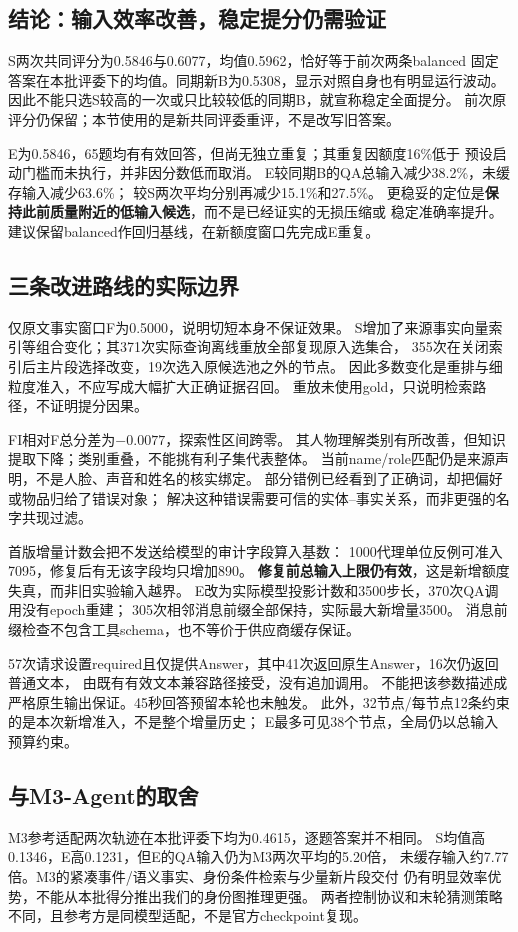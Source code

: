 \subsection{结论：输入效率改善，稳定提分仍需验证}
S两次共同评分为0.5846与0.6077，均值0.5962，恰好等于前次两条balanced
固定答案在本批评委下的均值。同期新B为0.5308，显示对照自身也有明显运行波动。
因此不能只选S较高的一次或只比较较低的同期B，就宣称稳定全面提分。
前次原评分仍保留；本节使用的是新共同评委重评，不是改写旧答案。

E为0.5846，65题均有有效回答，但尚无独立重复；其重复因额度16\%低于
预设启动门槛而未执行，并非因分数低而取消。
E较同期B的QA总输入减少38.2\%，未缓存输入减少63.6\%；
较S两次平均分别再减少15.1\%和27.5\%。
更稳妥的定位是\textbf{保持此前质量附近的低输入候选}，而不是已经证实的无损压缩或
稳定准确率提升。建议保留balanced作回归基线，在新额度窗口先完成E重复。

\subsection{三条改进路线的实际边界}
仅原文事实窗口F为0.5000，说明切短本身不保证效果。
S增加了来源事实向量索引等组合变化；其371次实际查询离线重放全部复现原入选集合，
355次在关闭索引后主片段选择改变，19次选入原候选池之外的节点。
因此多数变化是重排与细粒度准入，不应写成大幅扩大正确证据召回。
重放未使用gold，只说明检索路径，不证明提分因果。

FI相对F总分差为$-0.0077$，探索性区间跨零。
其人物理解类别有所改善，但知识提取下降；类别重叠，不能挑有利子集代表整体。
当前name/role匹配仍是来源声明，不是人脸、声音和姓名的核实绑定。
部分错例已经看到了正确词，却把偏好或物品归给了错误对象；
解决这种错误需要可信的实体--事实关系，而非更强的名字共现过滤。

首版增量计数会把不发送给模型的审计字段算入基数：
1000代理单位反例可准入7095，修复后有无该字段均只增加890。
\textbf{修复前总输入上限仍有效}，这是新增额度失真，而非旧实验输入越界。
E改为实际模型投影计数和3500步长，370次QA调用没有epoch重建；
305次相邻消息前缀全部保持，实际最大新增量3500。
消息前缀检查不包含工具schema，也不等价于供应商缓存保证。

57次请求设置required且仅提供Answer，其中41次返回原生Answer，16次仍返回普通文本，
由既有有效文本兼容路径接受，没有追加调用。
不能把该参数描述成严格原生输出保证。45秒回答预留本轮也未触发。
此外，32节点/每节点12条约束的是本次新增准入，不是整个增量历史；
E最多可见38个节点，全局仍以总输入预算约束。

\subsection{与M3-Agent的取舍}
M3参考适配两次轨迹在本批评委下均为0.4615，逐题答案并不相同。
S均值高0.1346，E高0.1231，但E的QA输入仍为M3两次平均的5.20倍，
未缓存输入约7.77倍。M3的紧凑事件/语义事实、身份条件检索与少量新片段交付
仍有明显效率优势，不能从本批得分推出我们的身份图推理更强。
两者控制协议和末轮猜测策略不同，且参考方是同模型适配，不是官方checkpoint复现。


